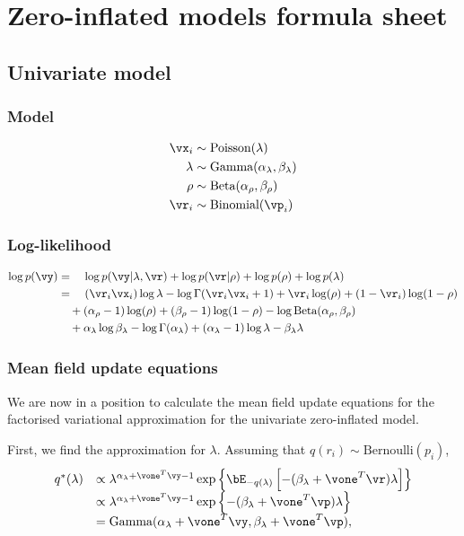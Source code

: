 \chapter{Zero-inflated models formula sheet}
\section{Univariate model} 

\subsection{Model}
\begin{align*}
	\vx_i   & \sim \text{Poisson}(\lambda)                    \\
	\lambda & \sim \text{Gamma}(\alpha_\lambda,\beta_\lambda) \\
	\rho    & \sim \text{Beta}(\alpha_\rho, \beta_\rho)       \\
	\vr_i   & \sim \text{Binomial}(\vp_i)                     
\end{align*}

\subsection{Log-likelihood}
\begin{align*}
\log p(\vy) &= \quad \log p(\vy | \lambda, \vr) + \log p(\vr | \rho) + \log p(\rho) + \log p(\lambda) \\
&= \quad (\vr_i \vx_i) \log \lambda - \log \Gamma(\vr_i \vx_i + 1) + \vr_i \log(\rho) + (1 - \vr_i) \log(1 - \rho) \\
& \quad + (\alpha_\rho - 1) \log (\rho) + (\beta_\rho - 1) \log(1 - \rho) - \log \text{Beta} (\alpha_\rho, \beta_\rho) \\
& \quad + \alpha_\lambda \log \beta_\lambda - \log \Gamma(\alpha_\lambda) + (\alpha_\lambda - 1) \log \lambda - \beta_\lambda \lambda
\end{align*}

\subsection{Mean field update equations}
We are now in a position to calculate the mean field update equations for the factorised
variational approximation for the univariate zero-inflated model.

First, we find the approximation for $\lambda$. Assuming that $q(r_i) \sim \text{Bernoulli}{(p_i)}$,
\[
\begin{array}{rl}
	q^*(\lambda)
	  & \propto                                                            
	\lambda^{\alpha_\lambda+\vone^T\vy - 1} 
	\exp\left\{ 
	\bE_{-q(\lambda)} \left[
	-(\beta_\lambda + \vone^T\vr) \lambda 
	\right] 
	\right\} 
	\\ [0.5ex]
	  &                                                                    
	\propto \lambda^{\alpha_\lambda+\vone^T\vy - 1} \exp{\left \{-(\beta_\lambda + \vone^T\vp)\lambda \right \} } 
	\\
	  & = \text{Gamma}{(\alpha_\lambda+\vone^T\vy, \beta_\lambda+\vone^T\vp)}, 
\end{array}
\]

